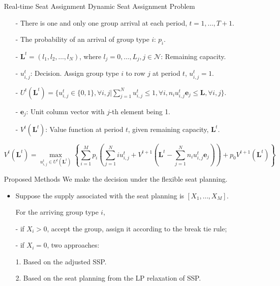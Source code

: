   \begin{frame}{Real-time Seat Assignment}
    \centering
    Dynamic Seat Assignment Problem
    \small
    \begin{itemize}
    \item[-] There is one and only one group arrival at each period, $t = 1, \ldots, T+1$. 
    \item[-] The probability of an arrival of group type $i$: $p_i$.
    \item[-] $\mathbf{L}^{t} = (l_1, l_2, \ldots, l_{N})$, where $l_j =0,\ldots, L_j, j\in \mathcal{N}$: Remaining capacity.
    \item[-] $u_{i,j}^{t}$: Decision. Assign group type $i$ to row $j$ at period $t$, $u_{i,j}^t =1$.
    \item[-] $U^{t}(\mathbf{L}^{t}) = \{u_{i,j}^{t} \in\{0,1\}, \forall i,j| \sum_{j=1}^{N} u_{i,j}^{t} \leq 1, \forall i, n_{i}u_{i,j}^{t}\mathbf{e}_j \leq \mathbf{L}, \forall i,j \}$.
    \item[-] $\mathbf{e}_j$: Unit column vector with $j$-th element being 1.
    \item[-] $V^{t}(\mathbf{L}^{t})$: Value function at period $t$, given remaining capacity, $\mathbf{L}^{t}$.
    \end{itemize}

    $$V^{t}(\mathbf{L}^{t}) = \max_{u_{i,j}^{t} \in U^{t}(\mathbf{L}^{t})}\left\{ \sum_{i=1}^{M} p_i ( \sum_{j=1}^{N} i u_{i,j}^{t} + V^{t+1}(\mathbf{L}^{t}- \sum_{j=1}^{N} n_i u_{i,j}^{t}\mathbf{e}_j)) + p_0 V^{t+1}(\mathbf{L}^{t})\right\}$$
    \small
\end{frame}

  \begin{frame}{Proposed Methods}
    We make the decision under the flexible seat planning.

    \begin{itemize}
      \item Suppose the supply associated with the seat planning is $[X_{1}, \ldots, X_M]$.
      
      \vspace{0.5cm}

      For the arriving group type $i$,

      \item[-] if $X_i > 0$, accept the group, assign it according to the break tie rule;
      
      \item[-] if $X_i = 0$, two approaches:
      
      \vspace{0.5cm}

      1. Based on the adjusted SSP.

      2. Based on the seat planning from the LP relaxation of SSP.

    \end{itemize}
  \end{frame}

